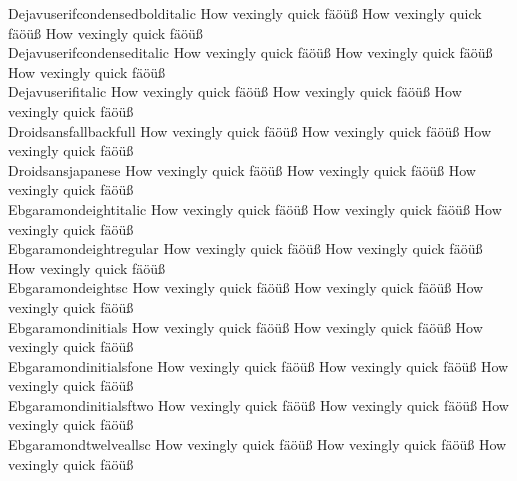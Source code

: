 \begin{tabbing}
Dejavuserifcondensedbolditalic \> {\mktsStyleNormal{}How vexingly quick fäöüß} {\mktsFontfileDejavuserifcondensedbolditalic{}How vexingly quick fäöüß} {\mktsStyleItalic{}How vexingly quick fäöüß} \\
Dejavuserifcondenseditalic \> {\mktsStyleNormal{}How vexingly quick fäöüß} {\mktsFontfileDejavuserifcondenseditalic{}How vexingly quick fäöüß} {\mktsStyleItalic{}How vexingly quick fäöüß} \\
Dejavuserifitalic \> {\mktsStyleNormal{}How vexingly quick fäöüß} {\mktsFontfileDejavuserifitalic{}How vexingly quick fäöüß} {\mktsStyleItalic{}How vexingly quick fäöüß} \\
Droidsansfallbackfull \> {\mktsStyleNormal{}How vexingly quick fäöüß} {\mktsFontfileDroidsansfallbackfull{}How vexingly quick fäöüß} {\mktsStyleItalic{}How vexingly quick fäöüß} \\
Droidsansjapanese \> {\mktsStyleNormal{}How vexingly quick fäöüß} {\mktsFontfileDroidsansjapanese{}How vexingly quick fäöüß} {\mktsStyleItalic{}How vexingly quick fäöüß} \\
Ebgaramondeightitalic \> {\mktsStyleNormal{}How vexingly quick fäöüß} {\mktsFontfileEbgaramondeightitalic{}How vexingly quick fäöüß} {\mktsStyleItalic{}How vexingly quick fäöüß} \\
Ebgaramondeightregular \> {\mktsStyleNormal{}How vexingly quick fäöüß} {\mktsFontfileEbgaramondeightregular{}How vexingly quick fäöüß} {\mktsStyleItalic{}How vexingly quick fäöüß} \\
Ebgaramondeightsc \> {\mktsStyleNormal{}How vexingly quick fäöüß} {\mktsFontfileEbgaramondeightsc{}How vexingly quick fäöüß} {\mktsStyleItalic{}How vexingly quick fäöüß} \\
Ebgaramondinitials \> {\mktsStyleNormal{}How vexingly quick fäöüß} {\mktsFontfileEbgaramondinitials{}How vexingly quick fäöüß} {\mktsStyleItalic{}How vexingly quick fäöüß} \\
Ebgaramondinitialsfone \> {\mktsStyleNormal{}How vexingly quick fäöüß} {\mktsFontfileEbgaramondinitialsfone{}How vexingly quick fäöüß} {\mktsStyleItalic{}How vexingly quick fäöüß} \\
Ebgaramondinitialsftwo \> {\mktsStyleNormal{}How vexingly quick fäöüß} {\mktsFontfileEbgaramondinitialsftwo{}How vexingly quick fäöüß} {\mktsStyleItalic{}How vexingly quick fäöüß} \\
Ebgaramondtwelveallsc \> {\mktsStyleNormal{}How vexingly quick fäöüß} {\mktsFontfileEbgaramondtwelveallsc{}How vexingly quick fäöüß} {\mktsStyleItalic{}How vexingly quick fäöüß} \\

\end{tabbing}
